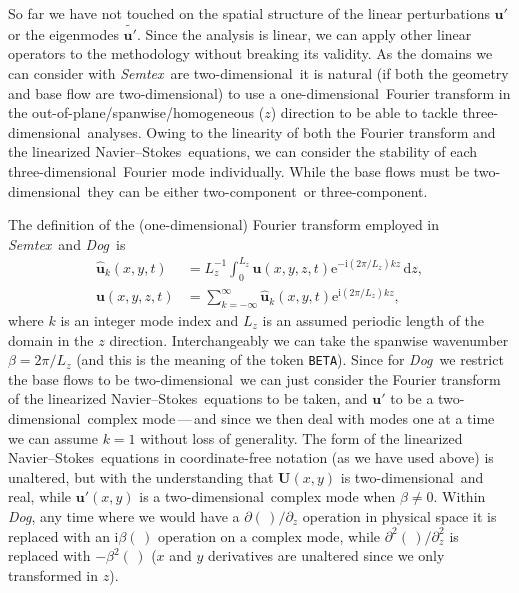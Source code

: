 \documentclass[11pt,a4paper]{report}
\newcommand\cd{\mathrm{d}}
\newcommand\ce{\mathrm{e}}
\newcommand\ci{\mathrm{i}}
\newcommand\wh[1]{\widehat{#1}}
\newcommand\wt[1]{\widetilde{#1}}
\newcommand\NavSto{Navier--Stokes}
\newcommand\LNS{linearized \NavSto}
\newcommand\oned{one-di\-men\-sion\-al}
\newcommand\twod{two-di\-men\-sion\-al}
\newcommand\threed{three-di\-men\-sion\-al}
\newcommand\twoc{two-com\-po\-nent}
\newcommand\threec{three-com\-po\-nent}
\newcommand\Ubase{{\bm{U}}}
\newcommand\upert{{\bm{u}'}}
\newcommand{\Semtex}{\emph{Semtex}}
\newcommand{\Dog}{\emph{Dog}}
\begin{document}
So far we have not touched on the spatial structure of the linear
perturbations $\upert$ or the eigenmodes $\wt{\upert}$. Since the
analysis is linear, we can apply other linear operators to the
methodology without breaking its validity. As the domains we can
consider with \Semtex\ are \twod\ it is natural (if both the geometry
and base flow are \twod) to use a \oned\ Fourier transform in the
out-of-plane/spanwise/homogeneous ($z$) direction to be able to tackle
\threed\ analyses.  Owing to the linearity of both the Fourier
transform and the \LNS\ equations, we can consider the stability of
each \threed\ Fourier mode individually.  While the base flows must be
\twod\, they can be either \twoc\ or \threec.

The definition of the (\oned) Fourier transform employed in
\Semtex\ and \Dog\ is
\begin{align}
\wh{\bm{u}}_k(x,y,t) &=
L_z^{-1}\int_0^{L_z}\bm{u}(x,y,z,t)\ce^{-\ci(2\pi/L_z)kz}\,\cd z,\\
\bm{u}(x,y,z,t) &= 
\sum_{k=-\infty}^\infty\wh{\bm{u}}_k(x,y,t)\ce^{\ci(2\pi/L_z)kz},
\end{align}
where $k$ is an integer mode index and $L_z$ is an assumed periodic
length of the domain in the $z$ direction.  Interchangeably we can take
the spanwise wavenumber $\beta=2\pi/L_z$ (and this is the meaning of
the token \verb+BETA+).  Since for \Dog\ we restrict the base flows to
be \twod\, we can just consider the Fourier transform of the
\LNS\ equations to be taken, and $\upert$ to be a \twod\ complex
mode\,---\,and since we then deal with modes one at a time we can
assume $k=1$ without loss of generality.  The form of the
\LNS\ equations in coordinate-free notation (as we have used above) is
unaltered, but with the understanding that $\Ubase(x,y)$ is \twod\ and
real, while $\upert(x,y)$ is a \twod\ complex mode when $\beta\ne0$.
Within \Dog, any time where we would have a $\partial(\,)/\partial_z$
operation in physical space it is replaced with an $\ci\beta(\,)$
operation on a complex mode, while $\partial^2(\,)/\partial_z^2$ is
replaced with $-\beta^2(\,)$ ($x$ and $y$ derivatives are unaltered
since we only transformed in $z$).
\end{document}
